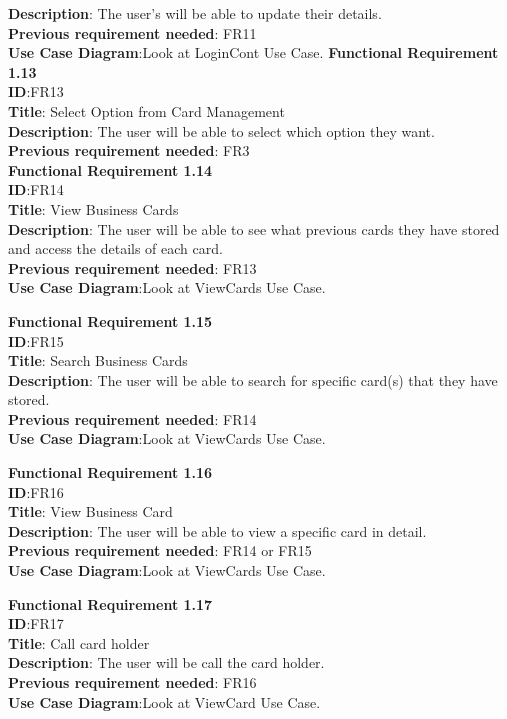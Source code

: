 \documentclass[english]{article}
\begin{document}
				\textbf{Description}: The user's will be able to update their details.\\
				\textbf{Previous requirement needed}: FR11\\
				\textbf{Use Case Diagram}:Look at LoginCont Use Case.
				\textbf{Functional Requirement 1.13}\\
				\textbf{ID}:FR13\\
				\textbf{Title}: Select Option from Card Management\\
				\textbf{Description}: The user will be able to select which option they want.\\
				\textbf{Previous requirement needed}: FR3\\
				
				\textbf{Functional Requirement 1.14}\\
				\textbf{ID}:FR14\\
				\textbf{Title}: View Business Cards\\
				\textbf{Description}: The user will be able to see what previous cards they have stored and access the details of each card.\\
				\textbf{Previous requirement needed}: FR13\\
				\textbf{Use Case Diagram}:Look at ViewCards Use Case.
				
				\textbf{Functional Requirement 1.15}\\
				\textbf{ID}:FR15\\
				\textbf{Title}: Search Business Cards\\
				\textbf{Description}: The user will be able to search for specific card(s) that they have stored.\\
				\textbf{Previous requirement needed}: FR14\\
				\textbf{Use Case Diagram}:Look at ViewCards Use Case.
				
				\textbf{Functional Requirement 1.16}\\
				\textbf{ID}:FR16\\
				\textbf{Title}: View Business Card\\
				\textbf{Description}: The user will be able to view a specific card in detail.\\
				\textbf{Previous requirement needed}: FR14 or FR15\\
				\textbf{Use Case Diagram}:Look at ViewCards Use Case.
				
				\textbf{Functional Requirement 1.17}\\
				\textbf{ID}:FR17\\
				\textbf{Title}: Call card holder\\
				\textbf{Description}: The user will be call the card holder.\\
				\textbf{Previous requirement needed}: FR16\\
				\textbf{Use Case Diagram}:Look at ViewCard Use Case.
				
\end{document}
